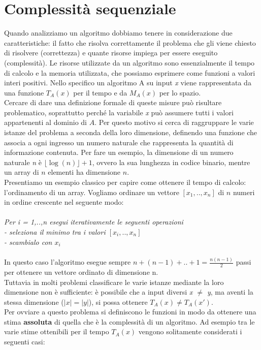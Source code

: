 \section{Complessità sequenziale}
Quando analizziamo un algoritmo dobbiamo tenere in considerazione due caratteristiche: il fatto che risolva correttamente il problema che gli viene chiesto di risolvere (correttezza) e quante risorse impiega per essere eseguito (complessità). Le risorse utilizzate da un algoritmo sono essenzialmente il tempo di calcolo e la memoria utilizzata, che possiamo esprimere come funzioni a valori interi positivi. Nello specifico un algoritmo A su input \textit{x} viene rappresentata da una funzione ${T}_{A}(x)$ per il tempo e da ${M}_{A}(x)$ per lo spazio.\\
Cercare di dare una definizione formale di queste misure può risultare problematico, soprattutto perché la variabile \textit{x} può assumere tutti i valori appartenenti al dominio di $A$. Per questo motivo si cerca di raggruppare le varie istanze del problema a seconda della loro dimensione, definendo una funzione che associa a ogni ingresso un numero naturale che rappresenta la quantità di informazione contenuta. Per fare un esempio, la dimensione di un numero naturale \textit{n} è $\lfloor \log(n) \rfloor +1$, ovvero la sua lunghezza in codice binario, mentre un array di $n$ elementi ha dimensione $n$.\\
Presentiamo un esempio classico per capire come ottenere il tempo di calcolo: l'ordinamento di un array. Vogliamo ordinare un vettore $[x_1,..,x_n]$ di $n$ numeri in ordine crescente nel seguente modo:\\
\\
\textit{Per i = 1,..,n esegui iterativamente le seguenti operazioni\\
    - seleziona il minimo tra i valori $[x_i,..,x_n]$\\
    - scambialo con $x_i$}\\
\\
In questo caso l'algoritmo esegue sempre $n + (n-1) + .. + 1 = \frac{n(n-1)}{2} $ passi per ottenere un vettore ordinato di dimensione n.\\
Tuttavia in molti problemi classificare le varie istanze mediante la loro dimensione non è sufficiente: è possibile che a input diversi \textit{x $\neq$ y}, ma aventi la stessa dimensione ($|x| = |y|$), si possa ottenere ${T}_{A}(x) \neq {T}_{A}(x')$.\\
Per ovviare a questo problema si definiscono le funzioni in modo da ottenere una stima \textbf{assoluta} di quella che è la complessità di un algoritmo. Ad esempio tra le varie stime ottenibili per il tempo ${T}_{A}(x)$ vengono solitamente considerati i seguenti casi:
